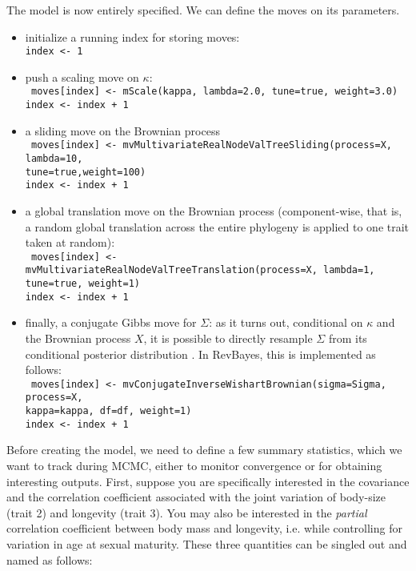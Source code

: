 \documentclass[usletter]{article}
\newcommand{\cmd}[1]{\texttt{#1}}
\begin{document}
The model is now entirely specified. We can define the moves on its parameters.
\begin{itemize}
\item
initialize a running index for storing moves:
\\
\cmd{index <- 1}
\item
push a scaling move on $\kappa$:
\\
\cmd{
moves[index] <- mScale(kappa, lambda=2.0, tune=true, weight=3.0)
\\
index <- index + 1
}
\item
a sliding move on the Brownian process
\\
\cmd{
moves[index] <- mvMultivariateRealNodeValTreeSliding(process=X, lambda=10,
\\
tune=true,weight=100)
\\
index <- index + 1
}
\item
a global translation move on the Brownian process (component-wise, that is, a random global translation across the entire phylogeny is applied to one trait taken at random):
\\
\cmd{
moves[index] <- mvMultivariateRealNodeValTreeTranslation(process=X, lambda=1,
\\
tune=true, weight=1)
\\
index <- index + 1
}
\item
finally, a conjugate Gibbs move for $\Sigma$: as it turns out, conditional on $\kappa$ and the Brownian process $X$, it is possible to directly resample $\Sigma$ from its conditional posterior distribution \citep{Lartillot:2011p55}. In RevBayes, this is implemented as follows:
\\
\cmd{
moves[index] <- mvConjugateInverseWishartBrownian(sigma=Sigma, process=X,
\\
kappa=kappa, df=df, weight=1)
\\
index <- index + 1
}
\end{itemize}
Before creating the model, we need to define a few summary statistics, which we want to track during MCMC, either to monitor convergence or for obtaining interesting outputs.
First, suppose you are specifically interested in the covariance and the correlation coefficient associated with the joint variation of body-size (trait 2) and longevity (trait 3). You may also be interested in the \emph{partial} correlation coefficient between body mass and longevity, i.e. while controlling for variation in age at sexual maturity. These three quantities can be singled out and named as follows:
\end{document}
